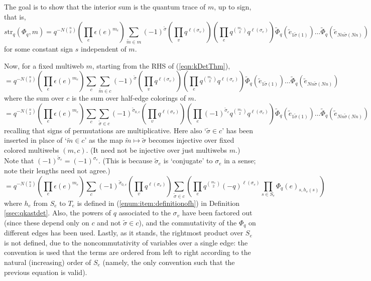 \documentclass[12pt, reqno]{amsart}
\theoremstyle{definition}
\renewcommand{\tilde}{\widetilde}
\newcommand{\be}{\begin{equation}}
\newcommand{\ee}{\end{equation}}
\newcommand{\trqc}{\mathrm{tr}_q}%
\begin{document}
The goal is to show that the interior sum is the quantum trace of $m$, up to sign, that is,  
\be\label{eqn:kDetThm}
s \trqc(\Phi_q,m) = q^{-N\binom{n}{2}}\left(\prod_{e}\epsilon(e)^{m_e}\right)\sum_{\tilde{m} \in m} (-1)^{\tilde{\sigma}}\left(\prod_v q^{\ell(\sigma_v)}\right)\left(\prod_e q^{\binom{m_e}{2}} q^{\ell(\sigma_e)}\right) \tilde{\Phi}_q(\tilde{e}_{1\tilde{\sigma}(1)})\dots\tilde{\Phi}_q(\tilde{e}_{Nn\tilde{\sigma}(Nn)})
\ee
for some constant sign $s$ independent of $m$. 

Now, for a fixed multiweb $m$, starting from the RHS of  (\ref{eqn:kDetThm}),
$$
= q^{-N\binom{n}{2}}\left(\prod_{e}\epsilon(e)^{m_e}\right)\sum_{c}\sum_{\tilde{m} \in c} (-1)^{\tilde{\sigma}}\left(\prod_v q^{\ell(\sigma_v)}\right)\left(\prod_e q^{\binom{m_e}{2}}q^{\ell(\sigma_e)}\right) \tilde{\Phi}_q(\tilde{e}_{1\tilde{\sigma}(1)})\dots\tilde{\Phi}_q(\tilde{e}_{Nn\tilde{\sigma}(Nn)})  \label{eqn:step1}
$$
where the sum over $c$ is the sum over half-edge colorings of $m$.
$$
= q^{-N\binom{n}{2}}\left(\prod_{e}\epsilon(e)^{m_e}\right)\sum_{c} \sum_{\tilde{\sigma} \in c} (-1)^{\tilde{\sigma}_{0,c}}\left(\prod_v q^{\ell(\sigma_v)}\right)\left(\prod_e (-1)^{\tilde{\sigma}_e}q^{\binom{m_e}{2}}q^{\ell(\sigma_e)}\right) \tilde{\Phi}_q(\tilde{e}_{1\tilde{\sigma}(1)})\dots\tilde{\Phi}_q(\tilde{e}_{Nn\tilde{\sigma}(Nn)}) \label{eqn:step2}
$$
recalling that signs of permutations are multiplicative.  Here also `$\tilde{\sigma}\in c$' has been inserted in place of `$\tilde{m}\in c$' as the map $\tilde{m}\mapsto\tilde{\sigma}$ becomes injective over fixed colored multiwebs $(m,c)$.  (It need not be injective over just multiwebs $m$.)  Note that $(-1)^{\tilde{\sigma}_e}=(-1)^{\sigma_e}$.  (This is because $\tilde{\sigma}_e$ is `conjugate' to $\sigma_e$ in a sense; note their lengths need not agree.)
$$
= q^{-N\binom{n}{2}}\left( \prod_{e}\epsilon(e)^{m_e} \right) \sum_{c} (-1)^{\tilde{\sigma}_{0,c}}\left(\prod_v q^{\ell(\sigma_v)}\right) \sum_{\tilde{\sigma} \in c} \left(\prod_e q^{\binom{m_e}{2}}(-q)^{\ell(\sigma_e)}\prod_{s\in S_e}\Phi_q(e)_{s,h_e(s)} \right)\label{eqn:step3}
$$
where $h_e$ from $S_e$ to $T_e$ is defined in (\ref{enum:item:definitionofh}) in Definition \ref{ssec:qkastdet}. Also, the powers of $q$ associated to the $\sigma_v$  have been factored out (since these depend only on $c$ and not $\tilde{\sigma}\in c$), and the commutativity of the $\Phi_q$ on different edges has been used.  Lastly, as it stands, the rightmost product over $S_e$ is not defined, due to the noncommutativity of variables over a single edge:  the convention is used that the terms are ordered from left to right according to the natural (increasing) order of $S_e$ (namely, the only convention such that the previous equation is valid).
\end{document}
